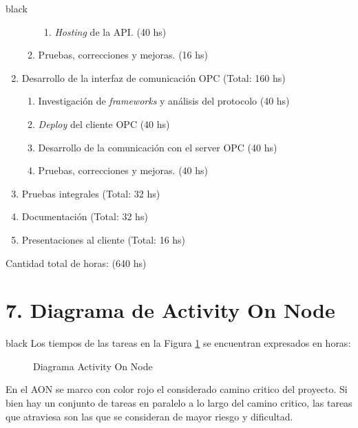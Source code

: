 \documentclass[11pt]{charter}
\begin{document}
\begin{consigna}{black}
\begin{enumerate}
\begin{enumerate}
\begin{enumerate}
			\item \textit{Hosting} de la API. (40 hs)
		\end{enumerate}
	\item Pruebas, correcciones y mejoras. (16 hs)
	\end{enumerate}
\item Desarrollo de la interfaz de comunicación OPC (Total: 160 hs)
	\begin{enumerate}
	\item Investigación de \textit{frameworks} y análisis del protocolo (40 hs)
	\item \textit{Deploy} del cliente OPC (40 hs)
	\item Desarrollo de la comunicación con el server OPC (40 hs)
	\item Pruebas, correcciones y mejoras. (40 hs)
	\end{enumerate}

\item Pruebas integrales (Total: 32 hs)

\item Documentación (Total: 32 hs)

\item Presentaciones al cliente (Total: 16 hs)
\end{enumerate}

Cantidad total de horas: (640 hs) 

\end{consigna}

\section{7. Diagrama de Activity On Node}
\label{sec:AoN}

\begin{consigna}{black}
Los tiempos de las tareas en la Figura \ref{fig:aon} se encuentran expresados en horas:

\begin{figure}[H]
    \centering
    \def\svgwidth{\columnwidth}  
    \fontsize{7}{5}\selectfont
    
	\caption{Diagrama Activity On Node}
	\label{fig:aon}
\end{figure}

En el AON se marco con color rojo el considerado camino critico del proyecto. Si bien hay un conjunto de tareas en paralelo a lo largo del camino critico, las tareas que atraviesa son las que se consideran de mayor riesgo y dificultad. 

\end{consigna}
\end{document}
